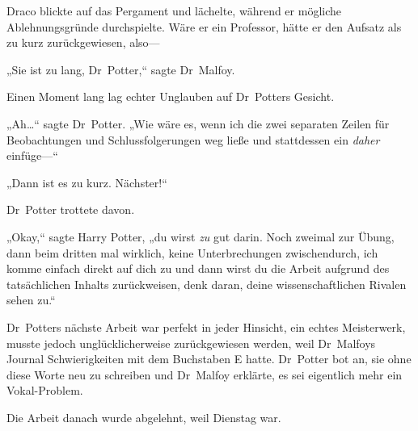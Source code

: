 Draco blickte auf das Pergament und lächelte, während er mögliche Ablehnungsgründe durchspielte. Wäre er ein Professor, hätte er den Aufsatz als zu kurz zurückgewiesen, also—

„Sie ist zu lang, Dr~Potter,“ sagte Dr~Malfoy.

Einen Moment lang lag echter Unglauben auf Dr~Potters Gesicht.

„Ah…“ sagte Dr~Potter. „Wie wäre es, wenn ich die zwei separaten Zeilen für Beobachtungen und Schlussfolgerungen weg ließe und stattdessen ein \emph{daher} einfüge—“

„Dann ist es zu kurz. Nächster!“

Dr~Potter trottete davon.

„Okay,“ sagte Harry Potter, „du wirst \emph{zu} gut darin. Noch zweimal zur Übung, dann beim dritten mal wirklich, keine Unterbrechungen zwischendurch, ich komme einfach direkt auf dich zu und dann wirst du die Arbeit aufgrund des tatsächlichen Inhalts zurückweisen, denk daran, deine wissenschaftlichen Rivalen sehen zu.“

Dr~Potters nächste Arbeit war perfekt in jeder Hinsicht, ein echtes Meisterwerk, musste jedoch unglücklicherweise zurückgewiesen werden, weil Dr~Malfoys Journal Schwierigkeiten mit dem Buchstaben E hatte. Dr~Potter bot an, sie ohne diese Worte neu zu schreiben und Dr~Malfoy erklärte, es sei eigentlich mehr ein Vokal-Problem.

Die Arbeit danach wurde abgelehnt, weil Dienstag war.

